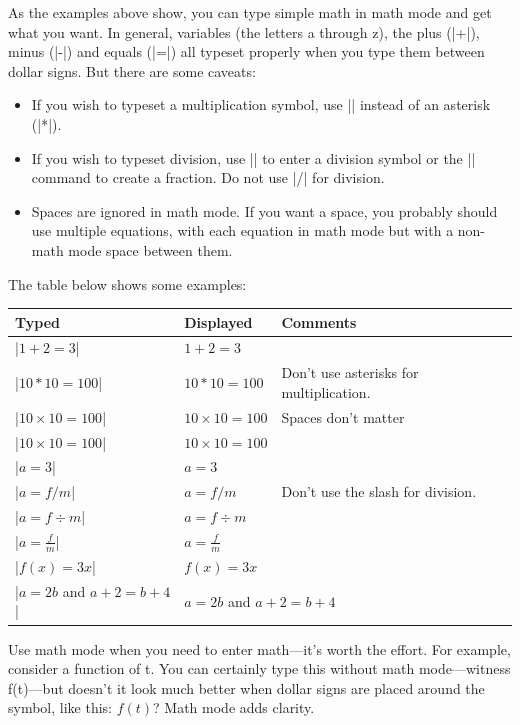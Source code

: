 As the examples above show, you can type simple math in math mode and get what
you want. In general, variables (the letters a through z), the plus (|+|),
minus (|-|) and equals (|=|) all typeset properly when you type them between
dollar signs.  But there are some caveats:

\begin{itemize}
\item If you wish to typeset a multiplication symbol, use |\times| instead
of an asterisk (|*|).
\item If you wish to typeset division, use |\div| to enter a division
  symbol or the |\frac| command to create a fraction. Do not use |/|
  for division. 
\item Spaces are ignored in math mode. If you want a space, you
  probably should use multiple equations, with each equation
  in math mode but with a non-math mode space between them.
\end{itemize}

The table below shows some examples:

\begin{center}
\begin{tabular}{l|l|l}
Typed                   & Displayed & Comments \\\hline
|$1+2=3$|               & $1+2=3$ \\
|$10 * 10 = 100$|       & $10 * 10 = 100$  & {\small Don't use asterisks for multiplication.}\\
|$10\times10=100$|      & $10\times10=100$ & Spaces don't matter\\
|$10  \times  10  =  100$|      & $10  \times  10  =  100$\\
|$a=3$|                 & $a=3$\\
|$a=f/m$|               & $a=f/m$ & {\small Don't use the slash for division.}\\
|$a=f \div m$|          & $a=f \div m$\\
|$a=\frac{f}{m}$|       & $a=\frac{f}{m}$\\
|$f(x)=3x$|             & $f(x)=3x$\\
|$a=2b$ and $a+2=b+4$|  & \multicolumn{2}{l}{$a=2b$ and $a+2=b+4$}\\
\end{tabular}
\end{center}

Use math mode when you need to enter math---it's worth the effort. For example,
consider a function of t. You can certainly type this without math
mode---witness f(t)---but doesn't it look much better when dollar signs are
placed around the symbol, like this: $f(t)$? Math mode adds clarity.

